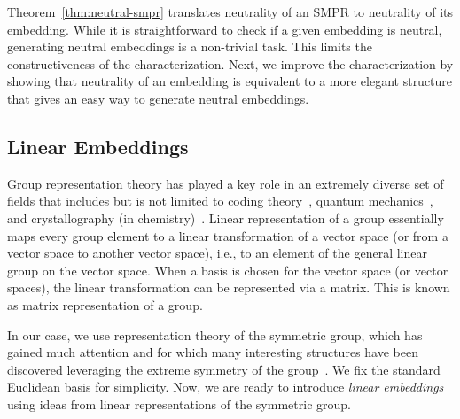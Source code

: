 \documentclass[prodmode,acmec]{ec-acmsmall}
\begin{document}
Theorem~\ref{thm:neutral-smpr} translates neutrality of an SMPR to neutrality of its embedding. While it is straightforward to check if a given embedding is neutral, generating neutral embeddings is a non-trivial task. This limits the constructiveness of the characterization. Next, we improve the characterization by showing that neutrality of an embedding is equivalent to a more elegant structure that gives an easy way to generate neutral embeddings. 

\subsection{Linear Embeddings}
\label{sec:linear}

Group representation theory has played a key role in an extremely diverse set of fields that includes but is not limited to %
coding theory~\cite{MS77}, quantum mechanics~\cite{BR86}, and crystallography (in chemistry)~\cite{KHS93}. Linear representation of a group essentially maps every group element to a linear transformation of a vector space (or from a vector space to another vector space), i.e., to an element of the general linear group on the vector space. When a basis is chosen for the vector space (or vector spaces), the linear transformation can be represented via a matrix. This is known as matrix representation of a group. 

In our case, we use representation theory of the symmetric group, which has gained much attention and for which many interesting structures have been discovered leveraging the extreme symmetry of the group~\cite{JKCR84}. We fix the standard Euclidean basis for simplicity. Now, we are ready to introduce \emph{linear embeddings} using ideas from linear representations of the symmetric group. 

\end{document}
